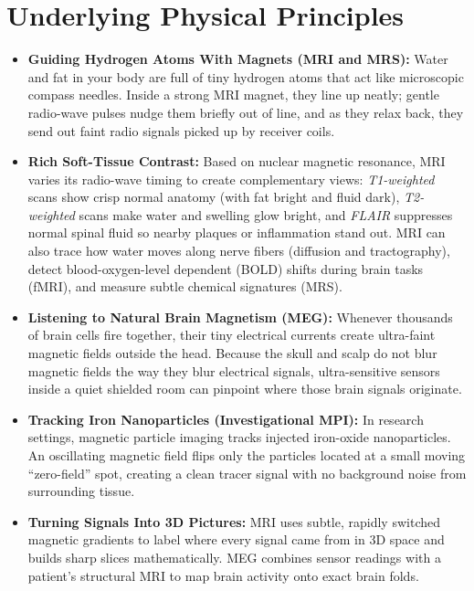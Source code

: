 \section{Underlying Physical Principles}
\begin{itemize}
  \item \textbf{Guiding Hydrogen Atoms With Magnets (MRI and MRS):} Water and fat in your body are full of tiny hydrogen atoms that act like microscopic compass needles. Inside a strong MRI magnet, they line up neatly; gentle radio-wave pulses nudge them briefly out of line, and as they relax back, they send out faint radio signals picked up by receiver coils.
  \item \textbf{Rich Soft-Tissue Contrast:} Based on nuclear magnetic resonance, MRI varies its radio-wave timing to create complementary views: \textit{T1-weighted} scans show crisp normal anatomy (with fat bright and fluid dark), \textit{T2-weighted} scans make water and swelling glow bright, and \textit{FLAIR} suppresses normal spinal fluid so nearby plaques or inflammation stand out. MRI can also trace how water moves along nerve fibers (diffusion and tractography), detect blood-oxygen-level dependent (BOLD) shifts during brain tasks (fMRI), and measure subtle chemical signatures (MRS).
  \item \textbf{Listening to Natural Brain Magnetism (MEG):} Whenever thousands of brain cells fire together, their tiny electrical currents create ultra-faint magnetic fields outside the head. Because the skull and scalp do not blur magnetic fields the way they blur electrical signals, ultra-sensitive sensors inside a quiet shielded room can pinpoint where those brain signals originate.
  \item \textbf{Tracking Iron Nanoparticles (Investigational MPI):} In research settings, magnetic particle imaging tracks injected iron-oxide nanoparticles. An oscillating magnetic field flips only the particles located at a small moving ``zero-field'' spot, creating a clean tracer signal with no background noise from surrounding tissue.
  \item \textbf{Turning Signals Into 3D Pictures:} MRI uses subtle, rapidly switched magnetic gradients to label where every signal came from in 3D space and builds sharp slices mathematically. MEG combines sensor readings with a patient's structural MRI to map brain activity onto exact brain folds.
\end{itemize}

